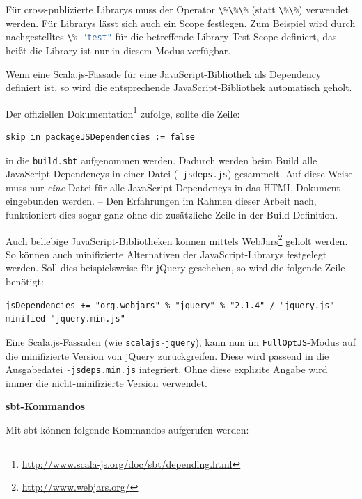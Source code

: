 \documentclass[a4paper, 12pt, hidelinks, listof=totoc, listoftables=totoc, bibliography=totoc]{scrreprt}
\newcommand{\code}[1]{\lstinline[language=Scala, style=inline]|#1|}
\newcommand{\MyMiniSec}[1]{\rmfamily\fontsize{12}{15}\selectfont
	\vspace{7pt}\textbf{#1} %
}
\begin{document}
Für cross-publizierte Librarys muss der Operator \code{\%\%\%} (statt \code{\%\%}) verwendet werden. Für Librarys lässt sich auch ein Scope festlegen. Zum Beispiel wird durch nachgestelltes \code{\% "test"} für die betreffende Library Test-Scope definiert, das heißt die Library ist nur in diesem Modus verfügbar.

Wenn eine Scala.js-Fassade für eine JavaScript-Bibliothek als Dependency definiert ist, so wird die entsprechende JavaScript-Bibliothek automatisch geholt.

Der offiziellen Dokumentation\footnote{ \url{http://www.scala-js.org/doc/sbt/depending.html}} zufolge, sollte die Zeile:

\begin{lstlisting}[style=snippet]
skip in packageJSDependencies := false
\end{lstlisting}

in die \code{build.sbt} aufgenommen werden. Dadurch werden beim Build alle JavaScript-Dependencys in einer Datei (\code{-jsdeps.js}) gesammelt. Auf diese Weise muss nur \emph{eine} Datei für alle JavaScript-Dependencys in das \ac{HTML}-Dokument eingebunden werden. -- Den Erfahrungen im Rahmen dieser Arbeit nach, funktioniert dies sogar ganz ohne die zusätzliche Zeile in der Build-Definition.

Auch beliebige JavaScript-Bibliotheken können mittels WebJars\footnote{\url{http://www.webjars.org/}} geholt werden. So können auch minifizierte Alternativen der JavaScript-Librarys festgelegt werden. Soll dies beispielsweise für jQuery geschehen, so wird die folgende Zeile benötigt:

\begin{lstlisting}[style=snippet]
jsDependencies += "org.webjars" % "jquery" % "2.1.4" / "jquery.js" minified "jquery.min.js"
\end{lstlisting}

Eine Scala.js-Fassaden (wie \code{scalajs-jquery}), kann nun im \code{FullOptJS}-Modus auf die minifizierte Version von jQuery zurückgreifen. Diese wird passend in die Ausgabedatei \mbox{\code{-jsdeps.min.js}} integriert. Ohne diese explizite Angabe wird immer die nicht-minifizierte Version verwendet.


\MyMiniSec{sbt-Kommandos}

Mit sbt können folgende Kommandos aufgerufen werden:
\end{document}
